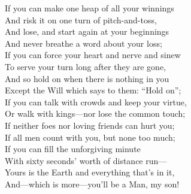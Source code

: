 \documentclass[a4,12pt]{article}
\begin{document}
\begin{center}
        \vspace{15pt}
        If you can make one heap of all your winnings\\
        And risk it on one turn of pitch-and-toss,\\
        And lose, and start again at your beginnings\\
        And never breathe a word about your loss;\\
        If you can force your heart and nerve and sinew\\
        To serve your turn long after they are gone,\\
        And so hold on when there is nothing in you\\
        Except the Will which says to them: “Hold on”;\\

        \vspace{15pt}
        If you can talk with crowds and keep your virtue,\\
        Or walk with kings—nor lose the common touch;\\
        If neither foes nor loving friends can hurt you;\\
        If all men count with you, but none too much;\\
        If you can fill the unforgiving minute\\
        With sixty seconds’ worth of distance run—\\
        Yours is the Earth and everything that’s in it,\\
        And—which is more—you’ll be a Man, my son!\\

 

    \end{center}
\end{document}
